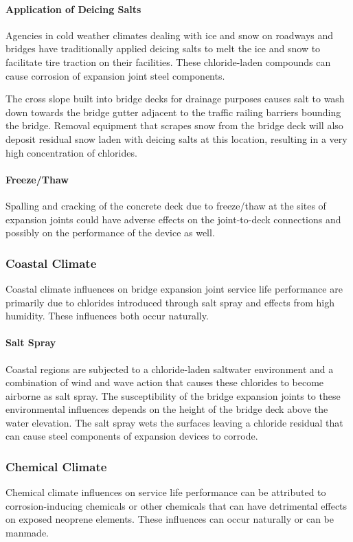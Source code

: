 \paragraph{Application of Deicing Salts}
Agencies in cold weather climates dealing with ice and snow on roadways and bridges have traditionally applied
deicing salts to melt the ice and snow to facilitate tire traction on their facilities. These chloride-laden compounds can
cause corrosion of expansion joint steel components.

The cross slope built into bridge decks for drainage purposes causes salt to wash down towards the bridge gutter
adjacent to the traffic railing barriers bounding the bridge. Removal equipment that scrapes snow from the bridge
deck will also deposit residual snow laden with deicing salts at this location, resulting in a very high concentration of
chlorides.

\paragraph{Freeze/Thaw}
Spalling and cracking of the concrete deck due to freeze/thaw at the sites of expansion joints could have adverse
effects on the joint-to-deck connections and possibly on the performance of the device as well.

\subsubsection{Coastal Climate}
Coastal climate influences on bridge expansion joint service life performance are primarily due to chlorides
introduced through salt spray and effects from high humidity. These influences both occur naturally.

\paragraph*{Salt Spray}
Coastal regions are subjected to a chloride-laden saltwater environment and a combination of wind and wave action that causes these chlorides to become airborne as salt spray. The susceptibility of the bridge expansion joints to these environmental influences depends on the height of the bridge deck above the water elevation. The salt spray wets the surfaces leaving a chloride residual that can cause steel components of expansion devices to corrode.

\subsubsection{Chemical Climate}
Chemical climate influences on service life performance can be attributed to corrosion-inducing chemicals or other chemicals that can have detrimental effects on exposed neoprene elements. These influences can occur naturally or can be manmade.

